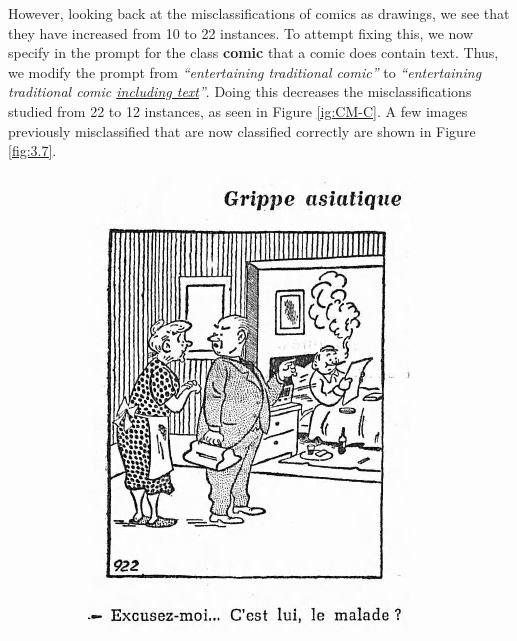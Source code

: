 However, looking back at the misclassifications of comics as drawings, we see that they have increased from 10 to 22 instances. To attempt fixing this, we now specify in the prompt for the class \textbf{comic} that a comic does contain text. Thus, we modify the prompt from \textit{“entertaining traditional comic”} to \textit{“entertaining traditional comic \underline{including text}”}. Doing this decreases the misclassifications studied from 22 to 12 instances, as seen in Figure \ref{ig:CM-C}. A few images previously misclassified that are now classified correctly are shown in Figure \ref{fig:3.7}.

\begin{figure}[ht]
    \centering

    \begin{subfigure}{0.25\textwidth}
        \includegraphics[width=\linewidth]{Images/IMP-1957-11-02-a-i0173_5.jpg}

\end{subfigure}
\end{figure}
